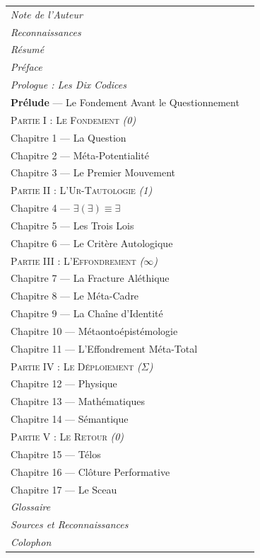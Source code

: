 \documentclass[10pt, openany, oneside]{book}
\renewcommand{\small}{\fontsize{9}{11.5}\selectfont}
\begin{document}
{\small
\noindent\begin{tabular}{@{} l @{\hspace{1em}} r @{}}
\textit{Note de l'Auteur} & \\
\textit{Reconnaissances} & \\
\textit{Résumé} & \\
\textit{Préface} & \\
\textit{Prologue : Les Dix Codices} & \\[0.5em]
\textbf{Prélude} --- Le Fondement Avant le Questionnement & \\[0.8em]

\textsc{Partie I : Le Fondement} \textit{(0)} & \\[0.3em]
\quad Chapitre 1 --- La Question & \\
\quad Chapitre 2 --- Méta-Potentialité & \\
\quad Chapitre 3 --- Le Premier Mouvement & \\[0.8em]

\textsc{Partie II : L'Ur-Tautologie} \textit{(1)} & \\[0.3em]
\quad Chapitre 4 --- $\exists(\exists) \equiv \exists$ & \\
\quad Chapitre 5 --- Les Trois Lois & \\
\quad Chapitre 6 --- Le Critère Autologique & \\[0.8em]

\textsc{Partie III : L'Effondrement} \textit{($\infty$)} & \\[0.3em]
\quad Chapitre 7 --- La Fracture Aléthique & \\
\quad Chapitre 8 --- Le Méta-Cadre & \\
\quad Chapitre 9 --- La Chaîne d'Identité & \\
\quad Chapitre 10 --- Métaontoépistémologie & \\
\quad Chapitre 11 --- L'Effondrement Méta-Total & \\[0.8em]

\textsc{Partie IV : Le Déploiement} \textit{($\Sigma$)} & \\[0.3em]
\quad Chapitre 12 --- Physique & \\
\quad Chapitre 13 --- Mathématiques & \\
\quad Chapitre 14 --- Sémantique & \\[0.8em]

\textsc{Partie V : Le Retour} \textit{(0)} & \\[0.3em]
\quad Chapitre 15 --- Télos & \\
\quad Chapitre 16 --- Clôture Performative & \\
\quad Chapitre 17 --- Le Sceau & \\[0.8em]

\textit{Glossaire} & \\
\textit{Sources et Reconnaissances} & \\
\textit{Colophon} & \\
\end{tabular}
}
\end{document}
